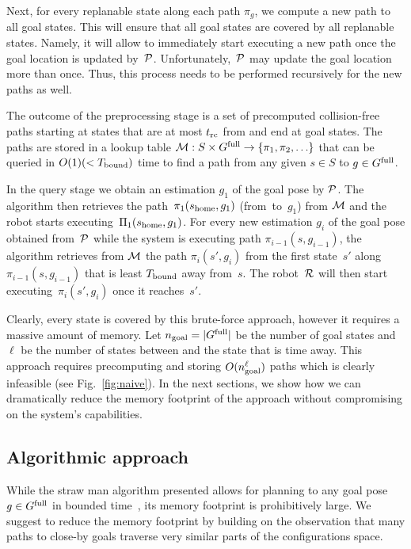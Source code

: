 \documentclass[conference]{IEEEtran}
\begin{document}
Next, for every replanable state along each path $\pi_g$, we compute a new path to all goal states. 
%
This will ensure that all goal states are covered by all replanable states. Namely, it will allow to immediately start executing a new path once the goal location is updated by~$\mathcal{P}$.
%
Unfortunately,~$\mathcal{P}$ may update the goal location more than once. Thus, this process needs to be performed recursively for the new paths as well.


The outcome of the preprocessing stage is a set of precomputed collision-free paths starting at states that are at most $t_{\textrm{rc}}$ from \Shome and end at goal states.
The paths are stored in a lookup table $\mathcal{M}: S \times G^{\textrm{full}} \rightarrow \{ \pi_1, \pi_2, \ldots \}$ that can be queried in $O(1) (< T_{\textrm{bound}})$ time to find a path from any given $s \in S$ to $g \in G^{\textrm{full}}$.

In the query stage we obtain an estimation $g_1$ of the goal pose by $\mathcal{P}$. 
The algorithm then retrieves the path~$\pi_1(s_{\textrm{home}},g_1)$ (from~\Shome to~$g_1$) from $\mathcal{M}$ and the robot starts executing~$\Pi_1(s_{\textrm{home}},g_1)$.
%
For every new estimation $g_i$ of the goal pose obtained from~$\mathcal{P}$  while the system is executing path $\pi_{i-1}(s,g_{i-1})$, the algorithm retrieves from $\mathcal{M}$ the path $\pi_i(s',g_i)$ from the first state~$s'$ along $\pi_{i-1}(s,g_{i-1})$ that is least $T_{\textrm{bound}}$ away from~$s$. The robot~$\mathcal{R}$ will then start executing~$\pi_i(s',g_i)$ once it reaches~$s'$.

Clearly, every state is covered by this brute-force approach, however it requires a massive amount of memory.
Let $n_{\rm goal} = \vert G^{\textrm{full}} \vert$ be the number of goal states and
$\ell$ be the number of states between \Shome and the state that is \Trc time away.
This approach requires precomputing and storing $O(n_{\rm goal}^\ell)$ paths which is clearly infeasible (see Fig.~\ref{fig:naive}).
In the next sections, we show how we can dramatically reduce the memory footprint of the approach without compromising on the system's capabilities.




\subsection{Algorithmic approach}
While the straw man algorithm presented  allows for planning to any goal pose $ g \in G^{\textrm{full}}$ in bounded time~\Tbound, its memory footprint is prohibitively large.
%
We suggest to reduce the memory footprint by building on the observation that many paths to close-by goals traverse very similar parts of the configurations space.
\end{document}
